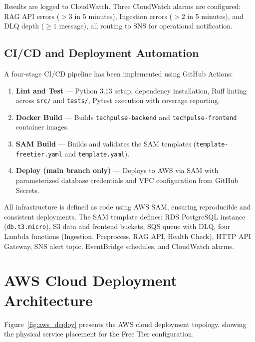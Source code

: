 Results are logged to CloudWatch. Three CloudWatch alarms are configured: RAG API errors ($>3$ in 5 minutes), Ingestion errors ($>2$ in 5 minutes), and DLQ depth ($\geq 1$ message), all routing to SNS for operational notification.

\subsection{CI/CD and Deployment Automation}

A four-stage CI/CD pipeline has been implemented using GitHub Actions:

\begin{enumerate}[leftmargin=0.5in]
  \item \textbf{Lint and Test} --- Python 3.13 setup, dependency installation, Ruff linting across \texttt{src/} and \texttt{tests/}, Pytest execution with coverage reporting.
  \item \textbf{Docker Build} --- Builds \texttt{techpulse-backend} and \texttt{techpulse-frontend} container images.
  \item \textbf{SAM Build} --- Builds and validates the SAM templates (\texttt{template-freetier.yaml} and \texttt{template.yaml}).
  \item \textbf{Deploy (main branch only)} --- Deploys to AWS via SAM with parameterized database credentials and VPC configuration from GitHub Secrets.
\end{enumerate}

All infrastructure is defined as code using AWS SAM, ensuring reproducible and consistent deployments. The SAM template defines: RDS PostgreSQL instance (\texttt{db.t3.micro}), S3 data and frontend buckets, SQS queue with DLQ, four Lambda functions (Ingestion, Preprocess, RAG API, Health Check), HTTP API Gateway, SNS alert topic, EventBridge schedules, and CloudWatch alarms.

\section{AWS Cloud Deployment Architecture}
\label{sec:cloud_arch}

Figure~\ref{fig:aws_deploy} presents the AWS cloud deployment topology, showing the physical service placement for the Free Tier configuration.

